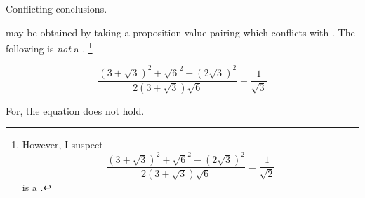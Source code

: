 

\begin{note}
  Conflicting conclusions.

   may be obtained by taking a proposition-value pairing which conflicts with \fc{}.
  The following is \emph{not} a \fc{}.%
  \footnote{
    However, I suspect
    \[\frac{(3 + \sqrt{3})^{2} + \sqrt{6}^{2} - (2\sqrt{3})^{2}}{2(3 + \sqrt{3})\sqrt{6}} = \frac{1}{\sqrt{2}}\]
    is a \fc{}.
  }

  \begin{illustration}
    \[\frac{(3 + \sqrt{3})^{2} + \sqrt{6}^{2} - (2\sqrt{3})^{2}}{2(3 + \sqrt{3})\sqrt{6}} = \frac{1}{\sqrt{3}}\]
  \end{illustration}
  For, the equation does not hold.
\end{note}

